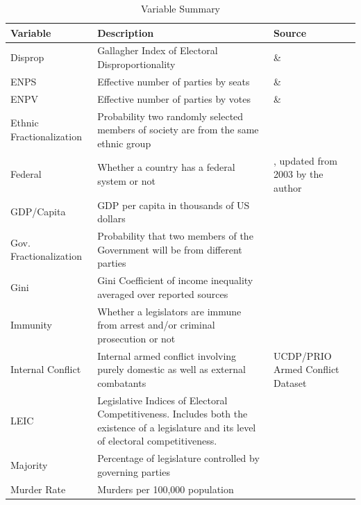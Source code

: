 \documentclass[a4paper]{article}\usepackage[]{graphicx}\usepackage[]{color}
\begin{document}


\begin{table}[!h]
    \begin{center}
    \caption{Variable Summary}
    \label{var_summary}
    \begin{tabular}{l m{7cm} m{3.5cm}}

            \hline
            Variable & Description & Source \\
            \hline \hline
            Disprop & Gallagher Index of Electoral Disproportionality & \cite{Gallagher2012} \& \cite{Carey2011} \\
            ENPS & Effective number of parties by seats & \cite{Gallagher2012} \& \cite{Carey2011} \\
            ENPV & Effective number of parties by votes & \cite{Gallagher2012} \& \cite{Carey2011} \\
            Ethnic Fractionalization & Probability two randomly selected members of society are from the same ethnic group & \cite{Alesina2003} \\
            Federal & Whether a country has a federal system or not & \cite{Carey2011}, updated from 2003 by the author \\
            GDP/Capita & GDP per capita in thousands of US dollars & \cite{WorldBank2011} \\
            Gov. Fractionalization & Probability that two members of the Government will be from different parties & \cite{DPI2001} \\
            Gini & Gini Coefficient of income inequality averaged over reported sources & \cite{UNU2008} \\
            Immunity & Whether a legislators are immune from arrest and/or criminal prosecution or not & \cite{Fish2009} \\
            Internal Conflict & Internal armed conflict involving purely domestic as well as external combatants & UCDP/PRIO Armed Conflict Dataset \citep{Themner2014} \\
            LEIC & Legislative Indices of Electoral Competitiveness. Includes both the existence of a legislature and its level of electoral competitiveness. & \cite{DPI2001} \\
            Majority & Percentage of legislature controlled by governing parties & \cite{DPI2001} \\
            Murder Rate & Murders per 100,000 population & \cite{UNMurder2013} \\

\end{tabular}
\end{center}
\end{table}
\end{document}
